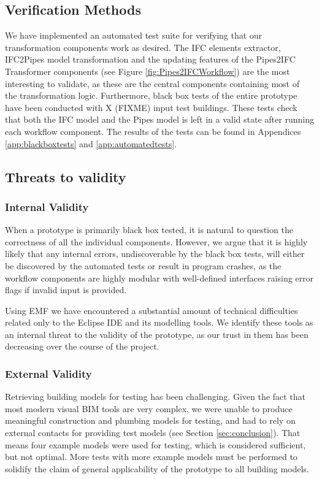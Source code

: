 \subsection{Verification Methods}
\label{subsec:verification_methods}
We have implemented an automated test suite for verifying that our transformation components work as desired. The IFC elements extractor, IFC2Pipes model transformation and the updating features of the Pipes2IFC Transformer components (see Figure \ref{fig:Pipes2IFCWorkflow}) are the most interesting to validate, as these are the central components containing most of the transformation logic. Furthermore, black box tests of the entire prototype have been conducted with X (FIXME) input test buildings. These tests check that both the IFC model and the Pipes model is left in a valid state after running each workflow component. The results of the tests can be found in Appendices \ref{app:blackboxtests} and \ref{app:automatedtests}.

\subsection{Threats to validity}
\subsubsection{Internal Validity} When a prototype is primarily black box tested, it is natural to question the correctness of all the individual components. However, we argue that it is highly likely that any internal errors, undiscoverable by the black box tests, will either be discovered by the automated tests or result in program crashes, as the workflow components are highly modular with well-defined interfaces raising error flags if invalid input is provided.

Using EMF we have encountered a substantial amount of technical difficulties related only to the Eclipse IDE and its modelling tools. We identify these tools as an internal threat to the validity of the prototype, as our trust in them has been decreasing over the course of the project.

\subsubsection{External Validity} Retrieving building models for testing has been challenging. Given the fact that most modern visual BIM tools are very complex, we were unable to produce meaningful construction and plumbing models for testing, and had to rely on external contacts for providing test models (see Section \ref{sec:conclusion}). That means four example models were used for testing, which is considered sufficient, but not optimal. More tests with more example models must be performed to solidify the claim of general applicability of the prototype to all building models.







